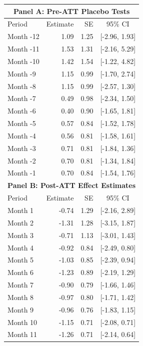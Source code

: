      \begin{tabular}{lrrc}
        \toprule
        \multicolumn{4}{c}{\textbf{Panel A: Pre-ATT Placebo Tests}} \\
        \midrule
        Period & Estimate & SE & 95\% CI \\
        \midrule
        Month -12 & 1.09 & 1.25 & [-2.96, 1.93] \\
        Month -11 & 1.53 & 1.31 & [-2.16, 5.29] \\
        Month -10 & 1.42 & 1.54 & [-1.22, 4.82] \\
        Month -9  & 1.15 & 0.99 & [-1.70, 2.74] \\
        Month -8  & 1.15 & 0.99 & [-2.57, 1.30] \\
        Month -7  & 0.49 & 0.98 & [-2.34, 1.50] \\
        Month -6  & 0.40 & 0.90 & [-1.65, 1.81] \\
        Month -5  & 0.57 & 0.84 & [-1.52, 1.78] \\
        Month -4  & 0.56 & 0.81 & [-1.58, 1.61] \\
        Month -3  & 0.71 & 0.81 & [-1.84, 1.36] \\
        Month -2  & 0.70 & 0.81 & [-1.34, 1.84] \\
        Month -1  & 0.70 & 0.84 & [-1.54, 1.76] \\
        \midrule
        \multicolumn{4}{c}{\textbf{Panel B: Post-ATT Effect Estimates}} \\
        \midrule
        Period & Estimate & SE & 95\% CI \\
        \midrule
        Month 1  & -0.74 & 1.29 & [-2.16, 2.89] \\
        Month 2  & -1.31 & 1.28 & [-3.15, 1.87] \\
        Month 3  & -0.71 & 1.13 & [-3.01, 1.43] \\
        Month 4  & -0.92 & 0.84 & [-2.49, 0.80] \\
        Month 5  & -1.03 & 0.85 & [-2.39, 0.94] \\
        Month 6  & -1.23 & 0.89 & [-2.19, 1.29] \\
        Month 7  & -0.90 & 0.79 & [-1.66, 1.46] \\
        Month 8  & -0.97 & 0.80 & [-1.71, 1.42] \\
        Month 9  & -0.96 & 0.76 & [-1.83, 1.15] \\
        Month 10 & -1.15 & 0.71 & [-2.08, 0.71] \\
        Month 11 & -1.26 & 0.71 & [-2.14, 0.64] \\

\end{tabular}
